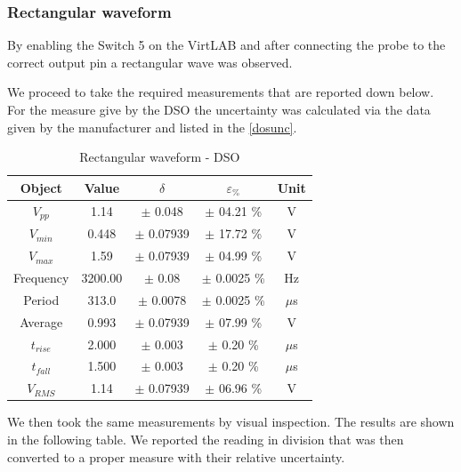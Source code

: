 \documentclass[../main.tex]{subfiles}
\begin{document}
\subsubsection*{Rectangular waveform}




By enabling the Switch 5 on the VirtLAB and after connecting the probe to the correct output pin a rectangular wave was observed.


We proceed to take the required measurements that are reported down below.
For the measure give by the DSO the uncertainty was calculated via the data given by the manufacturer and listed in the \autoref{dosunc}.


\begin{table}[h!]
\centering	

\begin{tabular}{ccccc}
\textbf{Object} & \textbf{Value} & \textbf{$\delta$} & \textbf{$\varepsilon_{\%}$} &  \textbf{Unit} \\
\hline
 $V_{pp}$ & 1.14  & $\pm$ 0.048 & $\pm$ 04.21 \% &  V \\
 \hline
 $V_{min}$ &  0.448 & $\pm$ 0.07939 & $\pm$ 17.72  \% &  V \\
 \hline
 $V_{max}$ & 1.59  & $\pm$ 0.07939 & $\pm$ 04.99 \% &  V  \\
 \hline
 Frequency & 3200.00 & $\pm$ 0.08 & $\pm$ 0.0025 \% &  Hz \\
 \hline
 Period & 313.0  & $\pm$ 0.0078 & $\pm$ 0.0025 \% &  $\mu$s \\
 \hline
 Average & 0.993  & $\pm$ 0.07939 & $\pm$  07.99 \% &  V \\ 
 \hline
  $t_{rise}$ & 2.000 & $\pm$ 0.003 & $\pm$  0.20 \% &  $\mu$s \\ 
 \hline
 $t_{fall}$ & 1.500  & $\pm$ 0.003 & $\pm$  0.20 \% &  $\mu$s \\ 
 \hline
 $V_{RMS}$ & 1.14  & $\pm$ 0.07939 & $\pm$ 06.96 \% &  V \\
 

\end{tabular}
\caption*{Rectangular waveform - DSO}
\end{table}


We then took the same measurements by visual inspection. The results are shown in the following table. We reported the reading in division that was then converted to a proper measure with their relative uncertainty.
\end{document}
